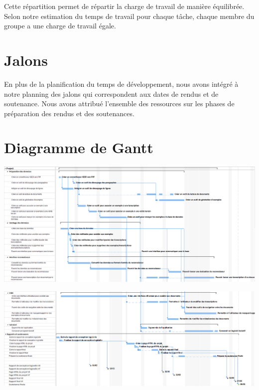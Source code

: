 Cette répartition permet de répartir la charge de travail de manière équilibrée. Selon notre estimation du temps de travail pour chaque tâche, chaque membre du groupe a une charge de travail égale.

\section{Jalons}

En plus de la planification du temps de développement, nous avons intégré à notre planning des jalons qui correspondent aux dates de rendus et de soutenance. Nous avons attribué l’ensemble des ressources sur les phases de préparation des rendus et des soutenances.

\section{Diagramme de Gantt}

\begin{mdframed}[frametitle={Figure 1 : Diagramme de Gantt du projet (1/2)}, innerbottommargin=10]
\begin{center}
\includegraphics[scale=0.35]{gantt_V2.1.PNG}
\end{center}
\end{mdframed}

\newpage

\begin{mdframed}[frametitle={Figure 2 : Diagramme de Gantt du projet (2/2)}, innerbottommargin=10]
\begin{center}
\includegraphics[scale=0.35]{gantt_V2.2.PNG}
\end{center}
\end{mdframed}




